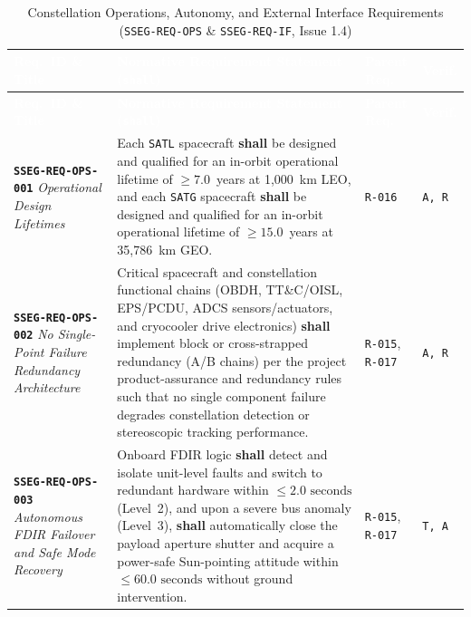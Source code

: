 \documentclass[11pt,a4paper]{article}
\newcommand{\thead}[1]{\textcolor{white}{\textbf{\textsf{#1}}}}
\providecommand{\abbr}[1]{#1}
\begin{document}
{\footnotesize\setlength{\tabcolsep}{4pt}\renewcommand{\arraystretch}{1.15}%
%
%
\setlength{\LTcapwidth}{\textwidth}%
\begin{longtable}{|>{\raggedright\arraybackslash}p{}|>{\raggedright\arraybackslash}p{}|>{\raggedright\arraybackslash}p{}|>{\raggedright\arraybackslash}p{}|}
\caption{Constellation Operations, Autonomy, and External Interface Requirements (\texttt{SSEG-REQ-OPS} \& \texttt{SSEG-REQ-IF}, Issue 1.4)}\label{tab:req_ops_if_i14}\\
\hline
\rowcolor{TableHeaderBlue}
\thead{Req.\ ID \& Title} & \thead{Normative Requirement Statement (\texttt{shall})} & \thead{Parent Req.} & \thead{Verif.} \\ \hline
\endfirsthead
\hline
\rowcolor{TableHeaderBlue}
\thead{Req.\ ID \& Title} & \thead{Normative Requirement Statement (\texttt{shall})} & \thead{Parent Req.} & \thead{Verif.} \\ \hline
\endhead
\endfoot
\endlastfoot
\textbf{\texttt{SSEG-REQ-OPS-001}} \newline \emph{Operational Design Lifetimes} & Each \texttt{SATL} spacecraft \textbf{shall} be designed and qualified for an in-orbit operational lifetime of $\ge 7.0$~years at 1,000~km \abbr{LEO}, and each \texttt{SATG} spacecraft \textbf{shall} be designed and qualified for an in-orbit operational lifetime of $\ge 15.0$~years at 35,786~km \abbr{GEO}. & \texttt{R-016} & \texttt{A, R} \\ \hline
\textbf{\texttt{SSEG-REQ-OPS-002}} \newline \emph{No Single-Point Failure Redundancy Architecture} & Critical spacecraft and constellation functional chains (\abbr{OBDH}, \abbr{TT\&C}/\abbr{OISL}, \abbr{EPS}/PCDU, \abbr{ADCS} sensors/actuators, and cryocooler drive electronics) \textbf{shall} implement block or cross-strapped redundancy (A/B chains) per the project product-assurance and redundancy rules such that no single component failure degrades constellation detection or stereoscopic tracking performance. & \texttt{R-015}, \texttt{R-017} & \texttt{A, R} \\ \hline
\textbf{\texttt{SSEG-REQ-OPS-003}} \newline \emph{Autonomous FDIR Failover and Safe Mode Recovery} & Onboard \abbr{FDIR} logic \textbf{shall} detect and isolate unit-level faults and switch to redundant hardware within $\le 2.0\text{ seconds}$ (Level~2), and upon a severe bus anomaly (Level~3), \textbf{shall} automatically close the payload aperture shutter and acquire a power-safe Sun-pointing attitude within $\le 60.0\text{ seconds}$ without ground intervention. & \texttt{R-015}, \newline \texttt{R-017} & \texttt{T, A} \\ \hline

\end{longtable}}
\end{document}
